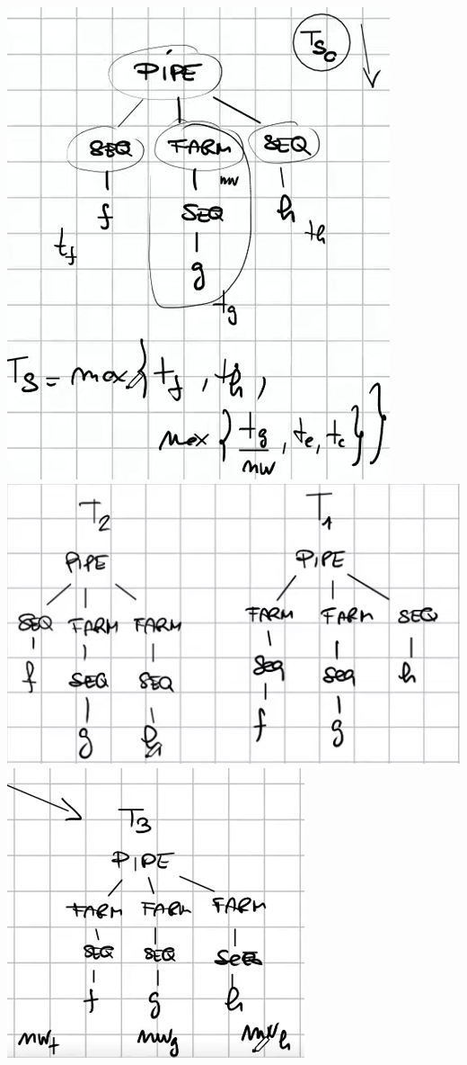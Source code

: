 \documentclass[10pt]{report}
\begin{document}
\begin{center}
	\includegraphics[scale=0.5]{35.png}
	\includegraphics[scale=0.75]{36.png}\\
	\includegraphics[scale=0.75]{37.png}
\end{center}
\end{document}
